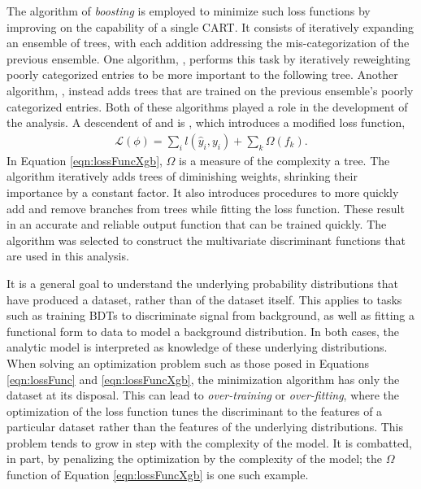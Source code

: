 The algorithm of \emph{boosting} is employed to minimize such loss functions by improving on the capability of a single CART.
It consists of iteratively expanding an ensemble of trees, with each addition addressing the mis-categorization of the previous ensemble.
One algorithm, , performs this task by iteratively reweighting poorly categorized entries to be more important to the following tree.
Another algorithm, , instead adds trees that are trained on the previous ensemble's poorly categorized entries.
Both of these algorithms played a role in the development of the analysis.
A descendent of  and  is \xgb, which introduces a modified loss function,
\begin{equation}\begin{split}\label{eqn:lossFuncXgb}
    \mathcal{L}(\phi)=\sum_i l(\hat{y}_i,y_i)+\sum_k \Omega(f_k).
\end{split}\end{equation} 
In Equation \ref{eqn:lossFuncXgb}, $\Omega$ is a measure of the complexity a tree.
The \xgb algorithm iteratively adds trees of diminishing weights, shrinking their importance by a constant factor.
It also introduces procedures to more quickly add and remove branches from trees while fitting the loss function.
These result in an accurate and reliable output function that can be trained quickly.
The \xgb algorithm was selected to construct the multivariate discriminant functions that are used in this analysis.
\cite{xgboost}

It is a general goal to understand the underlying probability distributions that have produced a dataset, rather than of the dataset itself.
This applies to tasks such as training BDTs to discriminate signal from background, as well as fitting a functional form to data to model a background distribution. 
In both cases, the analytic model is interpreted as knowledge of these underlying distributions.
When solving an optimization problem such as those posed in Equations \ref{eqn:lossFunc} and \ref{eqn:lossFuncXgb}, the minimization algorithm has only the dataset at its disposal.
This can lead to \emph{over-training} or \emph{over-fitting}, where the optimization of the loss function tunes the discriminant to the features of a particular dataset rather than the features of the underlying distributions.
This problem tends to grow in step with the complexity of the model.
It is combatted, in part, by penalizing the optimization by the complexity of the model; the $\Omega$ function of Equation \ref{eqn:lossFuncXgb} is one such example.

